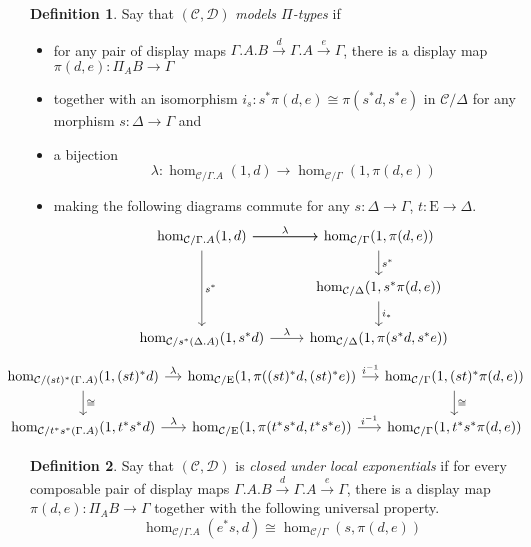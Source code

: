 \documentclass{article}
\theoremstyle{definition}
\newtheorem{definition}{Definition}[section]
\newcommand{\C}{\mathcal C}
\newcommand{\D}{\mathcal D}
\newcommand{\Epsilon}{\mathrm E}
\begin{document}
\begin{definition}
    Say that $(\C, \D)$ \emph{models $\Pi$-types} if 
    \begin{itemize}
        \item for any pair of display maps $\Gamma.A . B \xrightarrow{d} \Gamma. A  \xrightarrow{e} \Gamma$, there is a display map $\pi(d,e) : \Pi_A B \to \Gamma$
        \item together with an isomorphism $i_s : s^* \pi(d,e) \cong \pi(s^*d, s^*e)$ in $\C / \Delta$ for any morphism $s : \Delta \to \Gamma$ and
        \item a bijection
        \[ \lambda : \hom_{\C / \Gamma . A} (1, d) \to \hom_{\C / \Gamma} (1 , {\pi(d,e)})\]
        \item making the following diagrams commute for any $s : \Delta \to \Gamma$, $t : \Epsilon \to \Delta$.
        \[
     \begin{tikzcd}
        \hom_{\C / \Gamma . A} (1, d) \ar[r," "] \ar[dd,"s^*"] \ar[r, "\lambda"] & \hom_{\C / \Gamma} (1 , {\pi(d,e)}) \ar[d,"s^*"]
         \\
         & \hom_{\C / \Delta} (1 , s^* {\pi(d,e)})
         \ar[d,"i_*"]
         \\
         \hom_{\C / s^*(\Delta . A)} (1, s^* d) \ar[r,"\lambda"] & \hom_{\C / \Delta} (1 ,  {\pi(s^*d,s^*e)})
     \end{tikzcd}
\]
\[ \hspace{-4em}
     \begin{tikzcd}[column sep=small]
        \hom_{\C / (st)^*(\Gamma . A)} (1, (st)^*d) \ar[d,"\cong"] \ar[r, "\lambda"] &
        \hom_{\C / \Epsilon} (1 , {\pi((st)^*d,(st)^*e)})  \ar[r,"i^{-1}"]
        &  \hom_{\C / \Gamma} (1 , (st)^* \pi(d,e)) \ar[d,"\cong"]
        \\
        \hom_{\C / t^* s^* (\Gamma . A)} (1, t^* s^*d)  \ar[r, "\lambda"] &
        \hom_{\C / \Epsilon} (1 , {\pi(t^* s^*d,t^* s^*e)})  \ar[r,"i^{-1}"]
        &  \hom_{\C / \Gamma} (1 , t^* s^* \pi(d,e)) 
     \end{tikzcd}
\]
    \end{itemize}
\end{definition}

\begin{definition}
    Say that $(\C, \D)$ is \emph{closed under local exponentials} if for every composable pair of display maps $\Gamma.A . B \xrightarrow{d} \Gamma. A  \xrightarrow{e} \Gamma$, there is a display map $\pi(d,e) : \Pi_A B \to \Gamma$ together with the following universal property.
    \[ \hom_{\C / \Gamma . A} (e^* s,  d) \cong \hom_{\C / \Gamma} (s, {\pi(d,e)}) \]
\end{definition}
\end{document}
